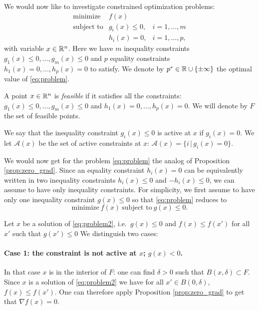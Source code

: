 \documentclass[11pt,nocut]{article}
\begin{document}
We would now like to investigate constrained optimization problems:
\begin{equation}\label{eq:problem}
	\begin{array}{lll}
		\text{minimize} & f(x) & \\
		\text{subject to} & g_i(x) \leq 0, & i=1, \dots, m \\
						  & h_i(x) = 0, & i=1, \dots, p,
	\end{array}
\end{equation}
with variable $x \in \mathbb{R}^n$.
Here we have $m$ inequality constraints $g_1(x) \leq 0, \dots, g_m(x)\leq  0$ and $p$ equality constraints $h_1(x) = 0, \dots, h_p(x) = 0$ to satisfy.
We denote by $p^* \in \mathbb{R} \cup \{\pm \infty\}$ the optimal value of \eqref{eq:problem}.

\begin{definition}
	A point $x \in \mathbb{R}^n$ is \emph{feasible} if it satisfies all the constraints: $g_1(x) \leq 0, \dots, g_m(x)\leq  0$ and $h_1(x) = 0, \dots, h_p(x) = 0$. We will denote by $F$ the set of feasible points.
\end{definition}

\begin{definition}
	We say that the inequality constraint $g_i(x) \leq 0$ is active at $x$ if $g_i(x) = 0$.
	We let $\mathcal{A}(x)$ be the set of active constraints at $x$: $\mathcal{A}(x) = \{ i \, | \, g_i(x) = 0\}$.
\end{definition}
We would now get for the problem \eqref{eq:problem} the analog of Proposition \ref{prop:zero_grad}.
Since an equality constraint $h_i(x) = 0$ can be equivalently written in two inequality constraints $h_i(x) \leq 0$ and $-h_i(x) \leq 0$, we can assume to have only inequality constraints.
For simplicity, we first assume to have only one inequality constraint $g(x) \leq 0$ so that \eqref{eq:problem} reduces to
\begin{equation}\label{eq:problem2}
	\text{minimize} \ f(x) \ \text{subject to} \ g(x) \leq 0.
\end{equation}


Let $x$ be a solution of \eqref{eq:problem2}, i.e.\ $g(x) \leq 0$ and $f(x) \leq f(x')$ for all $x'$ such that $g(x')\leq0$
We distinguish two cases:

\paragraph{Case 1: the constraint is not active at $x$; $g(x) <0$.} In that case $x$ is in the interior of $F$: one can find $\delta > 0$ such that $B(x,\delta) \subset F$. Since $x$ is a solution of \eqref{eq:problem2} we have for all $x' \in B(0,\delta)$, $f(x) \leq f(x')$. One can therefore apply Proposition \ref{prop:zero_grad} to get that $\nabla f(x) = 0$.
\end{document}
